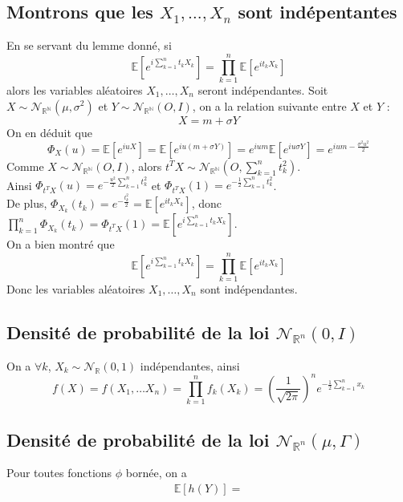 \documentclass{report}
\begin{document}
		\subsection{Montrons que les $X_1, \ldots, X_n$ sont indépentantes}
			En se servant du lemme donné, si 
			\[\mathbb{E}[e^{i\sum\limits_{k=1}^{n}t_kX_k}] = \prod\limits_{k=1}^{n}\mathbb{E}[e^{it_kX_k}]\]
			alors les variables aléatoires $X_1, \ldots, X_n$ seront indépendantes.
			Soit $X \sim \mathcal{N}_{\mathbb{R}^\mathbb{N}}(\mu, \sigma^2)$ et $Y \sim \mathcal{N}_{\mathbb{R}^\mathbb{N}}(O, I)$, on a la relation suivante entre $X$ et $Y$ :
			\[ X = m + \sigma Y \]
			On en déduit que
			\[ \Phi_X(u) = \mathbb{E}[e^{iuX}] = \mathbb{E}[e^{iu(m+\sigma Y)}] = e^{ium}\mathbb{E}[e^{iu\sigma Y}] = e^{ium-\frac{\sigma^2 u^2}{2}} \]
			Comme $X \sim \mathcal{N}_{\mathbb{R}^\mathbb{N}}(O, I)$, alors $t^TX \sim \mathcal{N}_{\mathbb{R}^\mathbb{N}}(O, \sum\limits_{k=1}^{n}t_k^2)$.\\
			Ainsi $\Phi_{t^TX}(u) = e^{-\frac{u^2}{2}\sum\limits_{k=1}^{n}t_k^2}$ et $\Phi_{t^TX}(1) = e^{-\frac{1}{2}\sum\limits_{k=1}^{n}t_k^2}$.\\
			De plus, $\Phi_{X_k}(t_k) = e^{-\frac{t_k^2}{2}} = \mathbb{E}[e^{it_kX_k}] $, donc $\prod\limits_{k=1}^{n}\Phi_{X_k}(t_k) = \Phi_{t^TX}(1) = \mathbb{E}[e^{i\sum\limits_{k=1}^{n}t_kX_k}] $.\\
			On a bien montré que 
			\[\mathbb{E}[e^{i\sum\limits_{k=1}^{n}t_kX_k}] = \prod\limits_{k=1}^{n}\mathbb{E}[e^{it_kX_k}]\]
			Donc les variables aléatoires $X_1, \ldots, X_n$ sont indépendantes.
		\subsection{Densité de probabilité de la loi $\mathcal{N}_{\mathbb{R}^n}(0, I)$}
			On a $\forall k$, $X_k \sim \mathcal{N}_{\mathbb{R}}(0, 1)$ indépendantes, ainsi
			\[ f(X) = f(X_1, \ldots X_n) = \prod\limits_{k=1}^{n}f_k(X_k) = (\frac{1}{\sqrt{2\pi}})^ne^{-\frac{1}{2}\sum\limits_{k=1}^{n}x_k} \]
		\subsection{Densité de probabilité de la loi $\mathcal{N}_{\mathbb{R}^n}(\mu, \Gamma)$}
			Pour toutes fonctions $\phi$ bornée, on a
			\begin{align*}
				\mathbb{E}[h(Y)] = 
			\end{align*}
\end{document}
